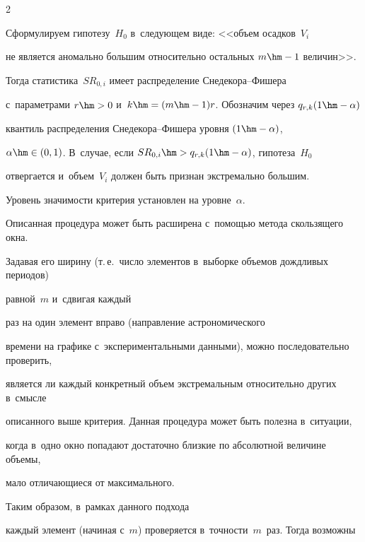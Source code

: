 \begin{multicols}{2}
\begin{equation*}
\end{equation*}











Сформулируем гипотезу~$H_0$ в~следующем виде: <<объем осадков~$V_i$ 


не является аномально большим относительно остальных $m\hm-1$ величин>>.


 Тогда статистика~$SR_{0,i}$ имеет распределение Сне\-де\-ко\-ра--Фи\-ше\-ра 


 с~параметрами $r\hm>0$ и~$k\hm=(m\hm-1)r$. Обозначим через $q_{r,k}(1\hm-\alpha)$ 


 квантиль распределения Сне\-де\-ко\-ра--Фи\-ше\-ра уровня $(1\hm-\alpha)$, 


 $\alpha\hm\in(0,1)$. В~случае, если $SR_{0,i}\hm>q_{r,k}(1\hm-\alpha)$, гипотеза~$H_0$ 


 отвергается и~объем~$V_i$ должен быть признан экстремально большим. 


 Уровень значимости критерия установлен на уровне~$\alpha$.





Описанная процедура может быть расширена с~помощью метода скользящего окна. 


Задавая его ширину (т.\,е.\ число элементов в~выборке объемов дождливых периодов) 


равной~$m$ и~сдвигая каждый\linebreak


 раз на один элемент вправо (направление астрономического 


времени на графике с~экспериментальными данными), можно последовательно проверить, 


является ли каждый конкретный объем экстремаль\-ным относительно других в~смысле 


описанного выше критерия. Данная процедура может быть полезна в~ситуации, 


когда в~одно окно попадают достаточно близкие по абсолютной величине объемы, 


мало отличающиеся от максимального. 





Таким образом, в~рамках данного подхода 


каж\-дый элемент (начиная с~$m$) проверяется в~точ\-ности~$m$~раз. Тогда возможны 



\end{multicols}
